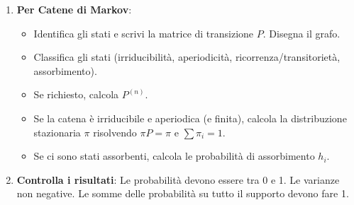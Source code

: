 \begin{enumerate}
    \item \textbf{Per Catene di Markov}:
        \begin{itemize}
            \item Identifica gli stati e scrivi la matrice di transizione $P$. Disegna il grafo.
            \item Classifica gli stati (irriducibilità, aperiodicità, ricorrenza/transitorietà, assorbimento).
            \item Se richiesto, calcola $P^{(n)}$.
            \item Se la catena è irriducibile e aperiodica (e finita), calcola la distribuzione stazionaria $\pi$ risolvendo $\pi P = \pi$ e $\sum \pi_i = 1$.
            \item Se ci sono stati assorbenti, calcola le probabilità di assorbimento $h_i$.
        \end{itemize}
    \item \textbf{Controlla i risultati}: Le probabilità devono essere tra 0 e 1. Le varianze non negative. Le somme delle probabilità su tutto il supporto devono fare 1.
\end{enumerate}


